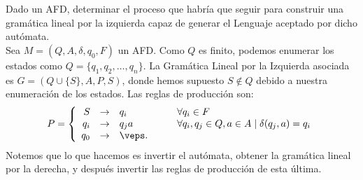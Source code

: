 \begin{ejercicio}
    Dado un AFD, determinar el proceso que habría que seguir para construir una gramática lineal por la izquierda capaz de generar el Lenguaje aceptado por dicho autómata.\\

    Sea $M=(Q, A, \delta, q_0, F)$ un AFD\@. Como $Q$ es finito, podemos enumerar los estados como $Q=\{q_1, q_2, \ldots, q_n\}$.    
    La Gramática Lineal por la Izquierda asociada es $G=(Q\cup \{S\}, A, P, S)$, donde hemos supuesto $S\notin Q$ debido a nuestra enumeración de los estados. Las reglas de producción son:
    \begin{equation*}
        P=\left\{
            \begin{array}{rcll}
                S &\to& q_i &\qquad \forall q_i\in F\\
                q_i &\to& q_j a &\qquad \forall q_i,q_j\in Q, a\in A \mid \delta(q_j, a)=q_i \\
                q_0 &\to& \veps.
            \end{array}
        \right.
    \end{equation*}
    Notemos que lo que hacemos es invertir el autómata, obtener la gramática lineal por la derecha, y después invertir las reglas de producción de esta última.
\end{ejercicio}

